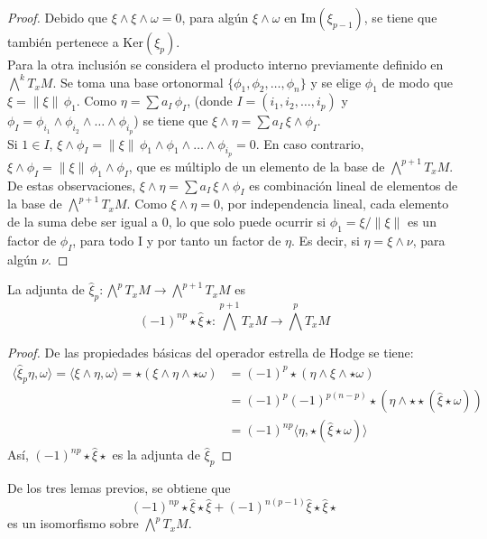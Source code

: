 \begin{proof}
Debido que $\xi \wedge \xi \wedge \omega = 0$,   para algún $\xi \wedge \omega$ en $\text{Im}(\xi_{p-1})$, se tiene que también pertenece a $\text{Ker}(\xi_{p})$.\\
Para la otra inclusión se considera el producto interno previamente definido en $\bigwedge^{k}T_xM$. Se toma una base ortonormal $\{\phi_1,\phi_2, \ldots,\phi_n\}$ y se elige $\phi_1$ de modo que $\xi = \|\xi\|\,\phi_1$. Como $\eta = \sum{a_I\, \phi_I}$, (donde $I = (i_1, i_2,\ldots,i_p)$ y $\phi_I = \phi_{i_1}\wedge\phi_{i_2}\wedge\ldots\wedge \phi_{i_p}$) se tiene que $\xi \wedge \eta = \sum{a_I\,\xi \wedge \phi_I}$.\\
Si $1 \in I$, $\xi \wedge \phi_I = \|\xi\|\,\phi_1 \wedge \phi_1 \wedge \ldots \wedge \phi_{i_p} = 0$. En caso contrario, $\xi \wedge \phi_I = \|\xi\|\,\phi_1\wedge\phi_I$, que es múltiplo de un elemento de la base de $\bigwedge^{p+1}T_xM$. De estas observaciones, $\xi \wedge \eta = \sum{a_I\,\xi \wedge \phi_I}$ es combinación lineal de elementos de la base de $\bigwedge^{p+1}T_xM$. Como $\xi \wedge \eta = 0$, por independencia lineal, cada elemento de la suma debe ser igual a 0, lo que solo puede ocurrir si $\phi_1 = \xi / \|\xi\|$ es un factor de $\phi_I$, para todo I y por tanto un factor de $\eta$. Es decir, si $\eta = \xi \wedge \nu $, para algún $\nu$.   
\end{proof}

\begin{lem}
La adjunta de $\hat\xi_p\colon\bigwedge^{p}T_xM\to\bigwedge^{p+1}T_xM$ es
\[(-1)^{np}\star\hat\xi\,\star\colon \bigwedge^{p+1}T_xM \to \bigwedge^{p}T_xM\]
\end{lem}

\begin{proof}
De las propiedades básicas del operador estrella de Hodge se tiene:
\begin{align*}
    \langle \hat \xi_p\eta, \omega \rangle = \langle \xi \wedge \eta, \omega\rangle = \star(\xi \wedge \eta \wedge\star\omega) &= (-1)^p\star(\eta \wedge \xi\wedge\star\omega)\\ &= (-1)^p(-1)^{p(n-p)}\star(\eta \wedge  \star\star(\hat\xi\star\omega)) \\
    &= (-1)^{np}\langle\eta, \star(\hat\xi\star\omega)\rangle
\end{align*}
Así, $(-1)^{np}\star\hat\xi\star$ es la adjunta de $\hat\xi_p$
\end{proof}


De los tres lemas previos, se obtiene que
\begin{equation}
\label{isomorfismo}
    (-1)^{np}\star\hat\xi\star\hat\xi + (-1)^{n(p-1)}\hat\xi\star\hat\xi\star
\end{equation}
es un isomorfismo sobre $\bigwedge^{p}T_xM$.
\\

